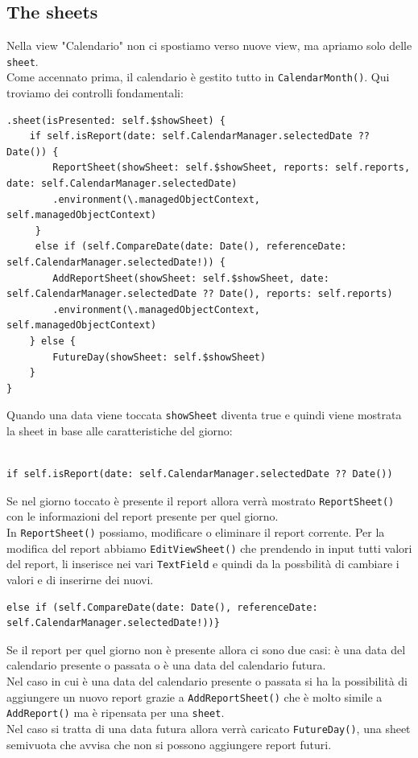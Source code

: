 \documentclass{article}
\begin{document}
\subsection{The sheets}

Nella view "Calendario" non ci spostiamo verso nuove view, ma apriamo solo delle \texttt{sheet}. \\
Come accennato prima, il calendario è gestito tutto in \texttt{CalendarMonth()}. Qui troviamo dei controlli fondamentali: 

\begin{lstlisting}
.sheet(isPresented: self.$showSheet) {
	if self.isReport(date: self.CalendarManager.selectedDate ?? Date()) {
		ReportSheet(showSheet: self.$showSheet, reports: self.reports, date: self.CalendarManager.selectedDate)
		.environment(\.managedObjectContext, self.managedObjectContext)
	 }
	 else if (self.CompareDate(date: Date(), referenceDate: self.CalendarManager.selectedDate!)) {
		AddReportSheet(showSheet: self.$showSheet, date: self.CalendarManager.selectedDate ?? Date(), reports: self.reports)
		.environment(\.managedObjectContext, self.managedObjectContext)
	} else {
		FutureDay(showSheet: self.$showSheet)
	}
}
\end{lstlisting}

Quando una data viene toccata \texttt{showSheet} diventa true e quindi viene mostrata la sheet in base alle caratteristiche del giorno:\\
\\
\begin{lstlisting}
if self.isReport(date: self.CalendarManager.selectedDate ?? Date())
\end{lstlisting}
Se nel giorno toccato è presente il report allora verrà mostrato \texttt{ReportSheet()} con le informazioni del report presente per quel giorno.\\
In \texttt{ReportSheet()} possiamo, modificare o eliminare il report corrente. Per la modifica del report abbiamo \texttt{EditViewSheet()} che prendendo in input tutti valori del report, li inserisce nei vari \texttt{TextField} e quindi da la possbilità di cambiare i valori e di inserirne dei nuovi.
\\
\begin{lstlisting}
else if (self.CompareDate(date: Date(), referenceDate: self.CalendarManager.selectedDate!))}
\end{lstlisting}
Se il report per quel giorno non è presente allora ci sono due casi: è una data del calendario presente o passata o è una data del calendario futura.\\
Nel caso in cui è una data del calendario presente o passata si ha la possibilità di aggiungere un nuovo report grazie a \texttt{AddReportSheet()} che è molto simile a \texttt{AddReport()} ma è ripensata per una \texttt{sheet}.\\
Nel caso si tratta di una data futura allora verrà caricato \texttt{FutureDay()}, una sheet semivuota che avvisa che non si possono aggiungere report futuri. 
\end{document}
